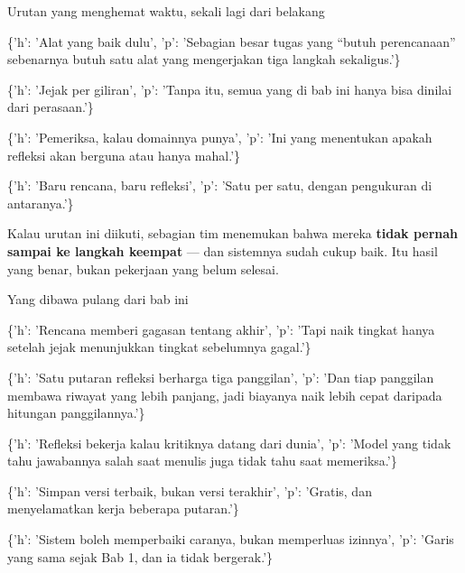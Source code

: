 \documentclass[aspectratio=169,11pt,t]{beamer}
\begin{document}
\begin{frame}[shrink=25]{Urutan yang menghemat waktu, sekali lagi dari belakang}
\begin{isteps}
\item \{'h': 'Alat yang baik dulu', 'p': 'Sebagian besar tugas yang ``butuh perencanaan'' sebenarnya butuh satu alat yang mengerjakan tiga langkah sekaligus.'\}
\item \{'h': 'Jejak per giliran', 'p': 'Tanpa itu, semua yang di bab ini hanya bisa dinilai dari perasaan.'\}
\item \{'h': 'Pemeriksa, kalau domainnya punya', 'p': 'Ini yang menentukan apakah refleksi akan berguna atau hanya mahal.'\}
\item \{'h': 'Baru rencana, baru refleksi', 'p': 'Satu per satu, dengan pengukuran di antaranya.'\}
\end{isteps}
\begin{iband}[signal]
Kalau urutan ini diikuti, sebagian tim menemukan bahwa mereka \textbf{tidak pernah sampai ke langkah keempat} --- dan sistemnya sudah cukup baik. Itu hasil yang benar, bukan pekerjaan yang belum selesai.
\end{iband}
\end{frame}

\begin{frame}[shrink=25]{Yang dibawa pulang dari bab ini}
\begin{isteps}
\item \{'h': 'Rencana memberi gagasan tentang akhir', 'p': 'Tapi naik tingkat hanya setelah jejak menunjukkan tingkat sebelumnya gagal.'\}
\item \{'h': 'Satu putaran refleksi berharga tiga panggilan', 'p': 'Dan tiap panggilan membawa riwayat yang lebih panjang, jadi biayanya naik lebih cepat daripada hitungan panggilannya.'\}
\item \{'h': 'Refleksi bekerja kalau kritiknya datang dari dunia', 'p': 'Model yang tidak tahu jawabannya salah saat menulis juga tidak tahu saat memeriksa.'\}
\item \{'h': 'Simpan versi terbaik, bukan versi terakhir', 'p': 'Gratis, dan menyelamatkan kerja beberapa putaran.'\}
\item \{'h': 'Sistem boleh memperbaiki caranya, bukan memperluas izinnya', 'p': 'Garis yang sama sejak Bab 1, dan ia tidak bergerak.'\}
\end{isteps}
\end{frame}
\end{document}
